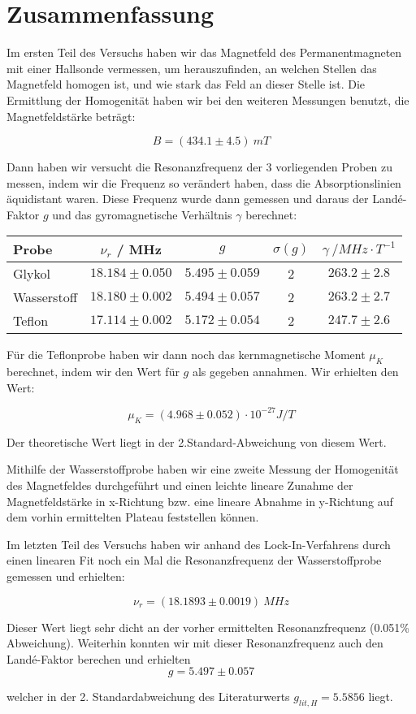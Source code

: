 \clearpage
\section{Zusammenfassung}

Im ersten Teil des Versuchs haben wir das Magnetfeld des Permanentmagneten mit einer Hallsonde vermessen, um herauszufinden, an welchen Stellen das Magnetfeld homogen ist, und wie stark das Feld an dieser Stelle ist. Die Ermittlung der Homogenität haben wir bei den weiteren Messungen benutzt, die Magnetfeldstärke beträgt:

$$ \boxed{B = (434.1 \pm 4.5)\ mT} $$

Dann haben wir versucht die Resonanzfrequenz der 3 vorliegenden Proben zu messen, indem wir die Frequenz so verändert haben, dass die Absorptionslinien äquidistant waren. Diese Frequenz wurde dann gemessen und daraus der Landé-Faktor $g$ und das gyromagnetische Verhältnis $\gamma$ berechnet:


\begin{center}
\begin{tabular}{| l | c | c | c | c |} \hline
Probe & $\nu_r$ / MHz & $g$ & $\sigma(g)$ & $\gamma\ / MHz\cdot T^{-1}$\\ \hline
Glykol & $18.184 \pm 0.050$ & $5.495 \pm 0.059$ & 2 & $263.2 \pm 2.8$ \\
Wasserstoff &$18.180 \pm 0.002$ & $ 5.494 \pm 0.057 $ & 2 & $263.2 \pm 2.7$ \\
Teflon & $17.114 \pm 0.002$ &  $5.172 \pm 0.054$ & 2 & $247.7 \pm 2.6$\\ \hline
\end{tabular}
\end{center}

Für die Teflonprobe haben wir dann noch das kernmagnetische Moment $\mu_K$ berechnet, indem wir den Wert für $g$ als gegeben annahmen. Wir erhielten den Wert:

$$\boxed{\mu_K = (4.968 \pm 0.052)\cdot 10^{-27} J/T} $$

Der theoretische Wert liegt in der 2.Standard-Abweichung von diesem Wert.

Mithilfe der Wasserstoffprobe haben wir eine zweite Messung der Homogenität des Magnetfeldes durchgeführt und einen leichte lineare Zunahme der Magnetfeldstärke in x-Richtung bzw. eine lineare Abnahme in y-Richtung auf dem vorhin ermittelten Plateau feststellen können.

Im letzten Teil des Versuchs haben wir anhand des Lock-In-Verfahrens durch einen linearen Fit noch ein Mal die Resonanzfrequenz der Wasserstoffprobe gemessen und erhielten:

$$\boxed{\nu_r = (18.1893 \pm 0.0019)\ MHz}$$

Dieser Wert liegt sehr dicht an der vorher ermittelten Resonanzfrequenz (0.051\% Abweichung). Weiterhin konnten wir mit dieser Resonanzfrequenz auch den Landé-Faktor berechen und erhielten
$$ g = 5.497 \pm 0.057 $$ 

welcher in der 2. Standardabweichung des Literaturwerts $g_{lit,H} = 5.5856$ liegt.
